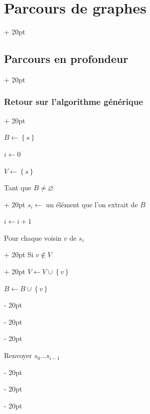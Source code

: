 \documentclass[a4paper, 12pt, twoside]{article}
\newcommand{\set}[1]{\left\{ #1 \right\}}
\newcommand{\ind}[1][20pt]{\advance\leftskip + #1}
\newcommand{\deind}[1][20pt]{\advance\leftskip - #1}
\newenvironment{indt}[2][20pt]{#2 \par \ind[#1]}{\par \deind} %
\begin{document}
\begin{indt}{\section{Parcours de graphes}}
\begin{indt}{\subsection{Parcours en profondeur}}
\begin{indt}{\subsubsection{Retour sur l'algorithme générique}}
                \begin{pseudocode}
                    $B \leftarrow \set s$

                    $i \leftarrow 0$

                    $V \leftarrow \set s$

                    \vspace{6pt}
                    
                    \begin{indt}{Tant que $B \neq \varnothing$}
                        $s_i \leftarrow$ un élément que l'on extrait de $B$
                        
                        $i \leftarrow i + 1$

                        \vspace{6pt}
                        
                        \begin{indt}{Pour chaque voisin $v$ de $s_i$}
                            \begin{indt}{Si $v \notin V$}
                                $V \leftarrow V \cup \set v$

                                $B \leftarrow B \cup \set v$
                            \end{indt}
                        \end{indt}
                    \end{indt}

                    \vspace{6pt}
                    
                    Renvoyer $s_0 \ldots s_{i - 1}$
                \end{pseudocode}

                \begin{center}
\end{center}
\end{indt}
\end{indt}
\end{indt}
\end{document}
